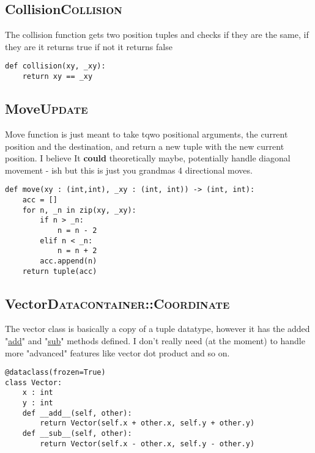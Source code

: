 \documentclass[11pt]{article}
\begin{document}
\subsection{Collision\hfill{}\textsc{Collision}}
\label{sec:orga35f0f7}

The collision function gets two position tuples and checks if they are the same, if they are it returns true if not it returns false

\begin{verbatim}
def collision(xy, _xy):
    return xy == _xy
\end{verbatim}


\subsection{Move\hfill{}\textsc{Update}}
\label{sec:orge98f3f6}

Move function is just meant to take tqwo positional arguments, the current position and the destination, and return a new tuple with the new current position. I believe It \textbf{could} theoretically maybe, potentially handle diagonal movement - ish but this is just you grandmas 4 directional moves.

\begin{verbatim}
def move(xy : (int,int), _xy : (int, int)) -> (int, int):
    acc = []
    for n, _n in zip(xy, _xy):
        if n > _n:
            n = n - 2
        elif n < _n:
            n = n + 2
        acc.append(n)
    return tuple(acc)

\end{verbatim}


\subsection{Vector\hfill{}\textsc{Datacontainer::Coordinate}}
\label{sec:org2cfcb61}

The vector class is basically a copy of a tuple datatype, however it has the added "\uline{\uline{add}}" and "\uline{\uline{sub}}" methods defined. I don't really need (at the moment) to handle more "advanced" features like vector dot product and so on.

\begin{verbatim}
@dataclass(frozen=True)
class Vector:
    x : int
    y : int
    def __add__(self, other):
        return Vector(self.x + other.x, self.y + other.y)
    def __sub__(self, other):
        return Vector(self.x - other.x, self.y - other.y)
\end{verbatim}
\end{document}
